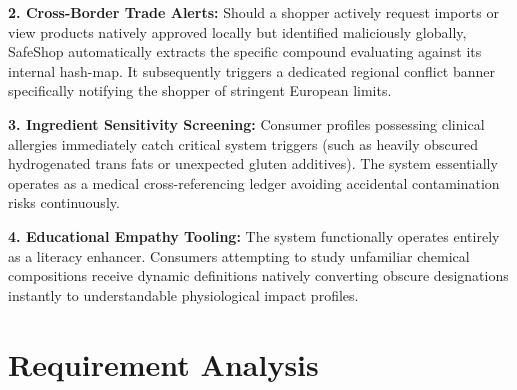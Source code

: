\documentclass[12pt,a4paper]{report}
\begin{document}
\textbf{2. Cross-Border Trade Alerts:} Should a shopper actively request imports or view products natively approved locally but identified maliciously globally, SafeShop automatically extracts the specific compound evaluating against its internal hash-map. It subsequently triggers a dedicated regional conflict banner specifically notifying the shopper of stringent European limits.

\textbf{3. Ingredient Sensitivity Screening:} Consumer profiles possessing clinical allergies immediately catch critical system triggers (such as heavily obscured hydrogenated trans fats or unexpected gluten additives). The system essentially operates as a medical cross-referencing ledger avoiding accidental contamination risks continuously.

\textbf{4. Educational Empathy Tooling:} The system functionally operates entirely as a literacy enhancer. Consumers attempting to study unfamiliar chemical compositions receive dynamic definitions natively converting obscure designations instantly to understandable physiological impact profiles.

\chapter{Requirement Analysis}
\end{document}
